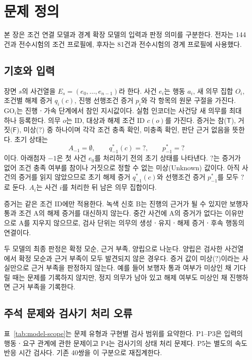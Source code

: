\section{문제 정의}
\label{sec:problem}

\begin{revision}
본 장은 조건 연결 모델과 경계 확장 모델의 입력과 판정 의미를 구분한다. 전자는 144건과 전수시험의 조건 프로필에, 후자는 81건과 전수시험의 경계 프로필에 사용했다.

\subsection{기호와 입력}
\label{sec:notation}
장면 $s$의 사건열을 $E_s=(e_0,\ldots,e_{n-1})$라 한다. 사건 $e_i$는 행동 $a_i$, 새 의무 집합 $O_i$, 조건별 해제 증거 $q_i(c)$, 진행 선행조건 증거 $p_i$와 각 항목의 원문 구절을 가진다. $\mathrm{GO}_i$는 진행ㆍ가속 단계에서 참인 지시값이다. 실험 인코더는 사건당 새 의무를 최대 하나 등록한다. 의무 $o$는 ID, 대상과 해제 조건 ID $c(o)$를 가진다. 증거는 참($\mathsf{T}$), 거짓($\mathsf{F}$), 미상($?$) 중 하나이며 각각 조건 충족 확인, 미충족 확인, 판단 근거 없음을 뜻한다. 초기 상태는
\begin{equation}
A_{-1}=\emptyset,\qquad q_{-1}^*(c)=?,\qquad p_{-1}^*=?
\end{equation}
이다. 아래첨자 $-1$은 첫 사건 $e_0$를 처리하기 전의 초기 상태를 나타낸다. $?$는 증거가 없어 조건 충족 여부를 참이나 거짓으로 정할 수 없는 미상(Unknown) 값이다. 아직 사건의 증거를 읽지 않았으므로 초기 해제 증거 $q_{-1}^*(c)$와 선행조건 증거 $p_{-1}^*$를 모두 $?$로 둔다. $A_i$는 사건 $i$를 처리한 뒤 남은 의무 집합이다.

증거는 같은 조건 ID에만 적용한다. 녹색 신호 B는 진행의 근거가 될 수 있지만 보행자 통과 조건 A의 해제 증거를 대신하지 않는다. 중간 사건에 A의 증거가 없다는 이유만으로 A를 지우지 않으므로, 검사 단위는 의무의 생성ㆍ유지ㆍ해제 증거ㆍ후속 행동의 연결이다.

두 모델의 최종 판정은 확정 모순, 근거 부족, 양립으로 나눈다. 양립은 검사한 사건열에서 확정 모순과 근거 부족이 모두 발견되지 않은 경우다. 증거 값이 미상($?$)이라는 사실만으로 근거 부족을 판정하지 않는다. 예를 들어 보행자 통과 여부가 미상인 채 기다릴 때는 문제를 기록하지 않지만, 정지 의무가 남아 있고 해제 여부도 미상인 채 진행하면 근거 부족을 기록한다.

\subsection{주석 문제와 검사기 처리 오류}
\label{sec:error-types}
표~\ref{tab:model-scope}는 문제 유형과 구현별 검사 범위를 요약한다. P1--P3은 입력의 행동ㆍ요구 관계에 관한 문제이고 P4는 검사기의 상태 처리 문제다. P5는 별도의 속도 반응 시간 검사다. 기존 40쌍을 이 구분으로 재집계한다.


\end{revision}
